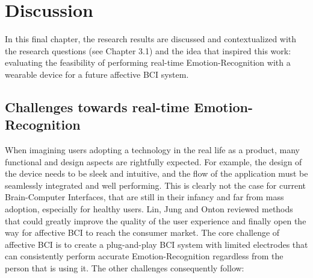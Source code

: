 \chapter{Discussion}
\label{chap:discussion}
In this final chapter, the research results are discussed and contextualized with the research questions (see Chapter 3.1) and the idea that inspired this work: evaluating the feasibility of performing real-time Emotion-Recognition with a wearable device for a future affective BCI system. 

\section{Challenges towards real-time Emotion-Recognition}

When imagining users adopting a technology in the real life as a product, many functional and design aspects are rightfully expected. For example, the design of the device needs to be sleek and intuitive, and the flow of the application must be seamlessly integrated and well performing. This is clearly not the case for current Brain-Computer Interfaces, that are still in their infancy and far from mass adoption, especially for healthy users. Lin, Jung and Onton \cite{lin_toward_2015} reviewed methods that could greatly improve the quality of the user experience and finally open the way for affective \ac{BCI} to reach the consumer market. The core challenge of affective \ac{BCI}  is to create a plug-and-play \ac{BCI}  system with limited electrodes that can consistently perform accurate Emotion-Recognition regardless from the person that is using it. The other challenges consequently follow:

